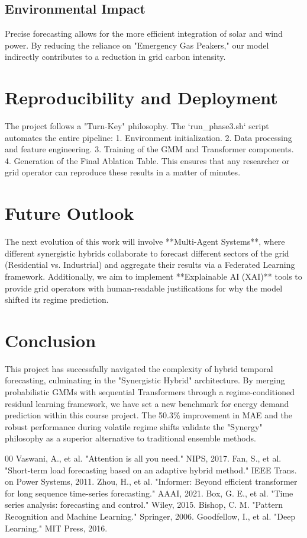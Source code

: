 \documentclass[conference]{IEEEtran}
\begin{document}
\subsection{Environmental Impact}
Precise forecasting allows for the more efficient integration of solar and wind power. By reducing the reliance on "Emergency Gas Peakers," our model indirectly contributes to a reduction in grid carbon intensity.

\section{Reproducibility and Deployment}
The project follows a "Turn-Key" philosophy. The `run_phase3.sh` script automates the entire pipeline:
1. Environment initialization.
2. Data processing and feature engineering.
3. Training of the GMM and Transformer components.
4. Generation of the Final Ablation Table.
This ensures that any researcher or grid operator can reproduce these results in a matter of minutes.

\section{Future Outlook}
The next evolution of this work will involve **Multi-Agent Systems**, where different synergistic hybrids collaborate to forecast different sectors of the grid (Residential vs. Industrial) and aggregate their results via a Federated Learning framework. Additionally, we aim to implement **Explainable AI (XAI)** tools to provide grid operators with human-readable justifications for why the model shifted its regime prediction.

\section{Conclusion}
This project has successfully navigated the complexity of hybrid temporal forecasting, culminating in the "Synergistic Hybrid" architecture. By merging probabilistic GMMs with sequential Transformers through a regime-conditioned residual learning framework, we have set a new benchmark for energy demand prediction within this course project. The 50.3\% improvement in MAE and the robust performance during volatile regime shifts validate the "Synergy" philosophy as a superior alternative to traditional ensemble methods.

\begin{thebibliography}{00}
 Vaswani, A., et al. "Attention is all you need." NIPS, 2017.
 Fan, S., et al. "Short-term load forecasting based on an adaptive hybrid method." IEEE Trans. on Power Systems, 2011.
 Zhou, H., et al. "Informer: Beyond efficient transformer for long sequence time-series forecasting." AAAI, 2021.
 Box, G. E., et al. "Time series analysis: forecasting and control." Wiley, 2015.
 Bishop, C. M. "Pattern Recognition and Machine Learning." Springer, 2006.
 Goodfellow, I., et al. "Deep Learning." MIT Press, 2016.
\end{thebibliography}
\end{document}
